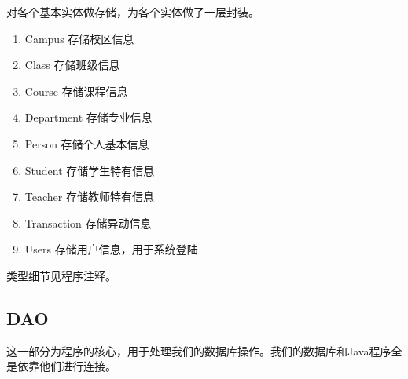 \documentclass[../report.tex]{subfiles}
\begin{document}
对各个基本实体做存储，为各个实体做了一层封装。

\begin{enumerate}
\itemsep 0em
\ttfamily 
\item Campus 存储校区信息
\item Class 存储班级信息
\item Course 存储课程信息
\item Department 存储专业信息
\item Person 存储个人基本信息
\item Student 存储学生特有信息
\item Teacher 存储教师特有信息
\item Transaction 存储异动信息
\item Users 存储用户信息，用于系统登陆
\end{enumerate}

类型细节见程序注释。

\subsection{DAO}

这一部分为程序的核心，用于处理我们的数据库操作。我们的数据库和Java程序全是依靠他们进行连接。
\end{document}
